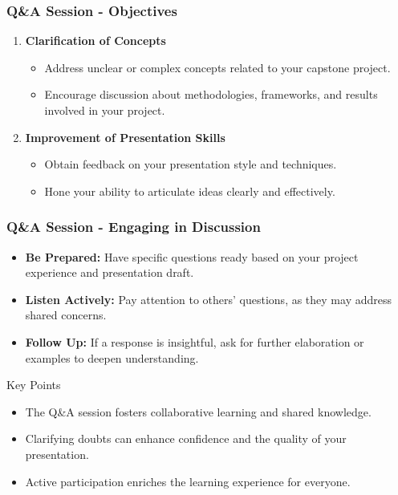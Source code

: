 \documentclass[aspectratio=169]{beamer}
\begin{document}
\begin{frame}[fragile]
  \frametitle{Q\&A Session - Objectives}
  \begin{enumerate}
    \item \textbf{Clarification of Concepts}
    \begin{itemize}
      \item Address unclear or complex concepts related to your capstone project.
      \item Encourage discussion about methodologies, frameworks, and results involved in your project.
    \end{itemize}
    
    \item \textbf{Improvement of Presentation Skills}
    \begin{itemize}
      \item Obtain feedback on your presentation style and techniques.
      \item Hone your ability to articulate ideas clearly and effectively.
    \end{itemize}
  \end{enumerate}
\end{frame}

\begin{frame}[fragile]
  \frametitle{Q\&A Session - Engaging in Discussion}
  \begin{itemize}
    \item \textbf{Be Prepared:} Have specific questions ready based on your project experience and presentation draft.
    \item \textbf{Listen Actively:} Pay attention to others’ questions, as they may address shared concerns.
    \item \textbf{Follow Up:} If a response is insightful, ask for further elaboration or examples to deepen understanding.
  \end{itemize}

  \begin{block}{Key Points}
    \begin{itemize}
      \item The Q\&A session fosters collaborative learning and shared knowledge.
      \item Clarifying doubts can enhance confidence and the quality of your presentation.
      \item Active participation enriches the learning experience for everyone.
    \end{itemize}
  \end{block}
\end{frame}
\end{document}
